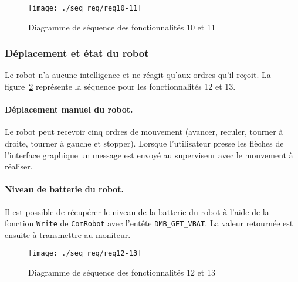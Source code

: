 \begin{figure}[htbp]
\begin{center}
\texttt{[image: ./seq\_req/req10-11]}
\caption{Diagramme de séquence des fonctionnalités 10 et 11}
\label{fig:diag10_11}
\end{center}
\end{figure}
\FloatBarrier

\subsubsection{Déplacement et état du robot}

Le robot n'a aucune intelligence et ne réagit qu'aux ordres qu'il reçoit.  La figure~\ref{fig:diag12_13} représente la séquence pour les fonctionnalités 12 et 13.

\paragraph{Déplacement manuel du robot.} Le robot peut recevoir cinq ordres de mouvement (avancer, reculer, tourner à droite, tourner à gauche et stopper). Lorsque l'utilisateur presse les flèches de l'interface graphique un message est envoyé au superviseur avec le mouvement à réaliser.\\


\paragraph{Niveau de batterie du robot.} Il est possible de récupérer le niveau de la batterie du robot à l'aide de la fonction  {\tt Write} de {\tt ComRobot} avec l'entête {\tt DMB\_GET\_VBAT}. La valeur retournée est ensuite à transmettre au moniteur.\\


\begin{figure}[htbp]
\begin{center}
\texttt{[image: ./seq\_req/req12-13]}
\caption{Diagramme de séquence des fonctionnalités 12 et 13}
\label{fig:diag12_13}
\end{center}
\end{figure}
\FloatBarrier

